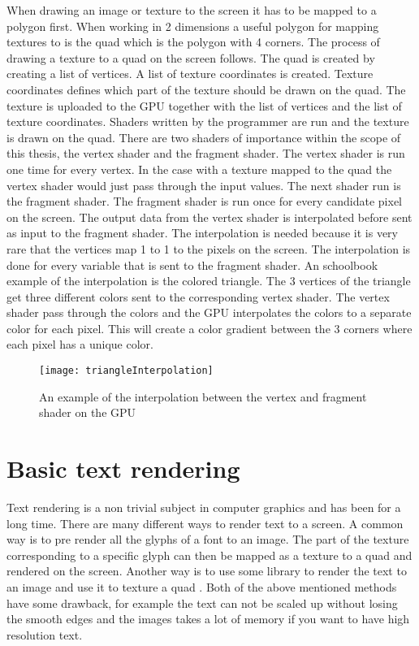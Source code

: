 When drawing an image or texture to the screen it has to be mapped to a polygon first. When working in 2 dimensions a useful polygon for mapping textures to is the quad which is the polygon with 4 corners. The process of drawing a texture to a quad on the screen follows. The quad is created by creating a list of vertices. A list of texture coordinates is created. Texture coordinates defines which part of the texture should be drawn on the quad. The texture is uploaded to the GPU together with the list of vertices and the list of texture coordinates. Shaders written by the programmer are run and the texture is drawn on the quad. There are two shaders of importance within the scope of this thesis, the vertex shader and the fragment shader. The vertex shader is run one time for every vertex. In the case with a texture mapped to the quad the vertex shader would just pass through the input values. The next shader run is the fragment shader. The fragment shader is run once for every candidate pixel on the screen. The output data from the vertex shader is interpolated before sent as input to the fragment shader. The interpolation is needed because it is very rare that the vertices map 1 to 1 to the pixels on the screen. The interpolation is done for every variable that is sent to the fragment shader. An schoolbook example of the interpolation is the colored triangle. The 3 vertices of the triangle get three different colors sent to the corresponding vertex shader. The vertex shader pass through the colors and the GPU interpolates the colors to a separate color for each pixel. This will create a color gradient between the 3 corners where each pixel has a unique color. 
\begin{figure}[H]
\centerline{\texttt{[image: triangleInterpolation]}}
\caption{An example of the interpolation between the vertex and fragment shader on the GPU}
\end{figure}
\section{Basic text rendering}\label{textrendering}
Text rendering is a non trivial subject in computer graphics and has been for a long time. There are many different ways to render text to a screen. A common way is to pre render all the glyphs of a font to an image. The part of the texture corresponding to a specific glyph can then be mapped as a texture to a quad and rendered on the screen. Another way is to use some library to render the text to an image and use it to texture a quad \citep{FreeType}. Both of the above mentioned methods have some drawback, for example the text can not be scaled up without losing the smooth edges and the images takes a lot of memory if you want to have high resolution text.

